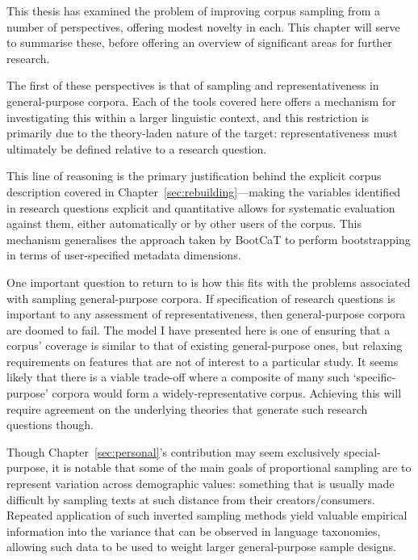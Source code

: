 

This thesis has examined the problem of improving corpus sampling from a number of perspectives, offering modest novelty in each.  This chapter will serve to summarise these, before offering an overview of significant areas for further research.

The first of these perspectives is that of sampling and representativeness in general-purpose corpora.  Each of the tools covered here offers a mechanism for investigating this within a larger linguistic context, and this restriction is primarily due to the theory-laden nature of the target: representativeness must ultimately be defined relative to a research question.

This line of reasoning is the primary justification behind the explicit corpus description covered in Chapter~\ref{sec:rebuilding}---making the variables identified in research questions explicit and quantitative allows for systematic evaluation against them, either automatically or by other users of the corpus.  This mechanism generalises the approach taken by BootCaT to perform bootstrapping in terms of user-specified metadata dimensions.

One important question to return to is how this fits with the problems associated with sampling general-purpose corpora.  If specification of research questions is important to any assessment of representativeness, then general-purpose corpora are doomed to fail.  The model I have presented here is one of ensuring that a corpus' coverage is similar to that of existing general-purpose ones, but relaxing requirements on features that are not of interest to a particular study.  It seems likely that there is a viable trade-off where a composite of many such `specific-purpose' corpora would form a widely-representative corpus.  Achieving this will require agreement on the underlying theories that generate such research questions though.

Though Chapter~\ref{sec:personal}'s contribution may seem exclusively special-purpose, it is notable that some of the main goals of proportional sampling are to represent variation across demographic values: something that is usually made difficult by sampling texts at such distance from their creators/consumers.  Repeated application of such inverted sampling methods yield valuable empirical information into the variance that can be observed in language taxonomies, allowing such data to be used to weight larger general-purpose sample designs.


